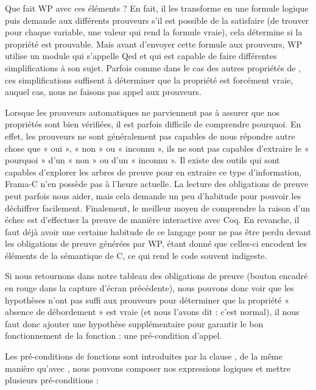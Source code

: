 Que fait WP avec ces éléments ? En fait, il les transforme en une formule 
logique puis demande aux différents prouveurs s'il est possible de la 
satisfaire (de trouver pour chaque variable, une valeur qui rend la formule 
vraie), cela détermine si la propriété est prouvable. Mais avant d'envoyer 
cette formule aux prouveurs, WP utilise un module qui s'appelle Qed et qui est
capable de faire différentes simplifications à son sujet. Parfois comme dans 
le cas des autres propriétés de , ces simplifications suffisent à 
déterminer que la propriété est forcément vraie, auquel cas, nous ne faisons
pas appel aux prouveurs.



Lorsque les prouveurs automatiques ne parviennent pas à assurer que nos 
propriétés sont bien vérifiées, il est parfois difficile de comprendre 
pourquoi. En effet, les prouveurs ne sont généralement pas capables de nous 
répondre autre chose que « oui », « non » ou « inconnu », ils ne sont pas capables
d'extraire le « pourquoi » d'un « non » ou d'un « inconnu ». Il existe des outils qui
sont capables d'explorer les arbres de preuve pour en extraire ce type 
d'information, Frama-C n'en possède pas à l'heure actuelle. La lecture des
obligations de preuve peut parfois nous aider, mais cela demande un peu 
d'habitude pour pouvoir les déchiffrer facilement. Finalement, le meilleur
moyen de comprendre la raison d'un échec est d'effectuer la preuve de manière
interactive avec Coq. En revanche, il faut déjà avoir une certaine habitude de
ce langage pour ne pas être perdu devant les obligations de preuve générées par
WP, étant donné que celles-ci encodent les éléments de la sémantique de C, ce 
qui rend le code souvent indigeste.



Si nous retournons dans notre tableau des obligations de preuve (bouton 
encadré en rouge dans la capture d'écran précédente), nous pouvons donc voir
que les hypothèses n'ont pas suffi aux prouveurs pour déterminer que la
propriété  « absence de débordement » est vraie (et nous l'avons dit : c'est
normal), il nous faut donc ajouter une hypothèse supplémentaire pour garantir
le bon fonctionnement de la fonction : une pré-condition d'appel.





Les pré-conditions de fonctions sont introduites par la clause ,
de la même manière qu'avec , nous pouvons composer nos 
expressions logiques et mettre plusieurs pré-conditions :



